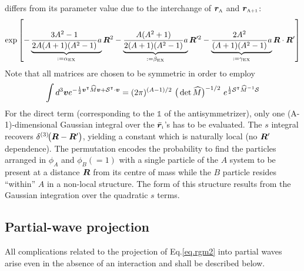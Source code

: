 \documentclass[aps,prd,onecolumn
,tightenlines,letterpaper,
notitlepage,11pt,linenumbers,
nofootinbib]{revtex4-1}
\begin{document}
differs from its parameter value due to the interchange of $\boldsymbol{r}_\text{\tiny A}$ and $\boldsymbol{r}_\text{\tiny A+1}$:
\begin{equation}
\exp{\left[-\underbrace{\frac{3A^2-1}{2A(A+1)(A^2-1)}a}_{:=\alpha_\text{\tiny EX}}\ensuremath{\boldsymbol{R}}^2-
\underbrace{\frac{A(A^2+1)}{2(A+1)(A^2-1)}a}_{:=\beta_\text{\tiny EX}}\ensuremath{\boldsymbol{R}}'^2-
\underbrace{\frac{2A^2}{(A+1)(A^2-1)}a}_{:=\gamma_\text{\tiny EX}}\ensuremath{\boldsymbol{R}}\cdot\ensuremath{\boldsymbol{R}}'\right]}
\end{equation}
Note that all matrices are chosen to be symmetric in order to employ
$$
\int d^3\boldsymbol{v}e^{-\frac{1}{2}\boldsymbol{v}^\intercal{\widehat{M}}\boldsymbol{v}+{\mathcal S}^\intercal\cdot\boldsymbol{v}}=(2\pi)^{(A-1)/2}~\big(\det{\widehat{M}}\big)^{-1/2}~e^{\frac{1}{2}{\mathcal S}^\intercal{\widehat{M}}^{-1}{\mathcal S}}
$$
For the direct term (corresponding to the $\mathbb{1}$ of the antisymmetrizer), only
one (A-1)-dimensional Gaussian integral over the $\bar{\boldsymbol{r}}_\text{\tiny i}$'s has to be evaluated.
The $s$ integral recovers $\delta^{(3)}\!\big(\boldsymbol{R}-\boldsymbol{R}'\big)$, yielding a constant which is
naturally local (no $\boldsymbol{R}'$ dependence). The permutation encodes the probability to
find the particles arranged in $\phi_A$ and $\phi_B(=1)$ with a single particle of
the $A$ system to be present at a distance $\boldsymbol{R}$ from its centre of mass while the
$B$ particle resides ``within'' $A$ in a non-local structure. The form of this
structure results from the Gaussian integration over the quadratic $s$ terms.

\subsection{Partial-wave projection}
All complications related to the projection of Eq.\eqref{eq.rgm2} into partial waves
arise even in the absence of an interaction and shall be described below.
\end{document}
